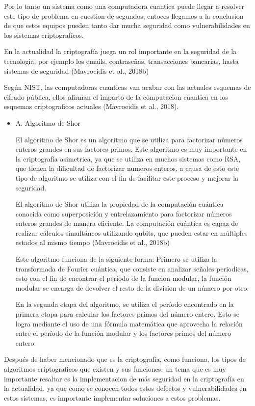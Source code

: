 \documentclass{article}
\begin{document}
Por lo tanto un sistema como una computadora cuantica puede llegar a resolver este tipo de problema en cuestion de segundos, entoces llegamos a la conclusion de que estos equipos pueden tanto dar mucha seguridad como vulnerabilidades en los sistemas criptografícos.

En la actualidad la criptografía juega un rol importante en la seguridad de la tecnologia, por ejemplo los emails, contraseñas, transacciones bancarias, hasta sistemas de seguridad (Mavroeidis et al., 2018b)

Según NIST, las computadoras cuanticas van acabar con las actuales esquemas de cifrado pública, ellos afirman el imparto de la computacion cuantica en los esquemas criptograficos actuales (Mavroeidis et al., 2018). 

\begin{itemize}
    \item{A}. Algoritmo de Shor

        El algoritmo de Shor es un algoritmo que se utiliza para factorizar números enteros grandes en sus factores primos. Este algoritmo es muy importante en la criptografía asimetrica, ya que se utiliza en muchos sistemas como RSA, que tienen la dificultad de factorizar numeros enteros, a causa de esto este tipo de algoritmo se utiliza con el fin de facilitar este proceso y mejorar la seguridad.

        El algoritmo de Shor utiliza la propiedad de la computación cuántica conocida como superposición y entrelazamiento para factorizar números enteros grandes de manera eficiente. La computación cuántica es capaz de realizar cálculos simultáneos utilizando qubits, que pueden estar en múltiples estados al mismo tiempo (Mavroeidis et al., 2018b)

        Este algoritmo funciona de la siguiente forma: Primero se utiliza la transformada de Fourier cuántica, que consiste en analizar señales periodicas, esto con el fin de encontrar el periodo de la funcion modular, la función modular se encarga de devolver el resto de la division de un número por otro.

        En la segunda etapa del algoritmo, se utiliza el período encontrado en la primera etapa para calcular los factores primos del número entero. Esto se logra mediante el uso de una fórmula matemática que aprovecha la relación entre el período de la función modular y los factores primos del número entero.
\end{itemize}

Después de haber mencionado que es la criptografía, como funciona, los tipos de algoritmos criptograficos que existen y sus funciones, un tema que es muy importante resaltar es la implementacion de más seguridad en la criptografía en la actualidad, ya que como se conocen todos estos defectos y vulnerabilidades en estos sistemas, es importante implementar soluciones a estos problemas.
\end{document}
